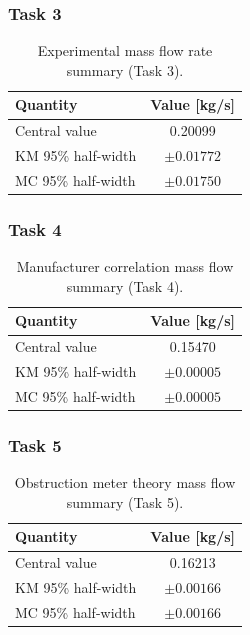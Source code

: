 \documentclass[11pt]{article}
\begin{document}
\subsubsection*{Task 3}
\begin{table}[H]
  \centering
  \begin{tabular}{l c}
    \hline
    Quantity           & Value [kg/s] \\
    \hline
    Central value      & 0.20099      \\
    KM 95\% half-width & $\pm 0.01772$ \\
    MC 95\% half-width & $\pm 0.01750$ \\
    \hline
  \end{tabular}
  \caption{Experimental mass flow rate summary (Task 3).}
\end{table}

\subsubsection*{Task 4}
\begin{table}[H]
  \centering
  \begin{tabular}{l c}
    \hline
    Quantity           & Value [kg/s] \\
    \hline
    Central value      & 0.15470      \\
    KM 95\% half-width & $\pm 0.00005$ \\
    MC 95\% half-width & $\pm 0.00005$ \\
    \hline
  \end{tabular}
  \caption{Manufacturer correlation mass flow summary (Task 4).}
\end{table}

\subsubsection*{Task 5}
\begin{table}[H]
  \centering
  \begin{tabular}{l c}
    \hline
    Quantity           & Value [kg/s] \\
    \hline
    Central value      & 0.16213      \\
    KM 95\% half-width & $\pm 0.00166$ \\
    MC 95\% half-width & $\pm 0.00166$ \\
    \hline
  \end{tabular}
  \caption{Obstruction meter theory mass flow summary (Task 5).}
\end{table}
\end{document}
